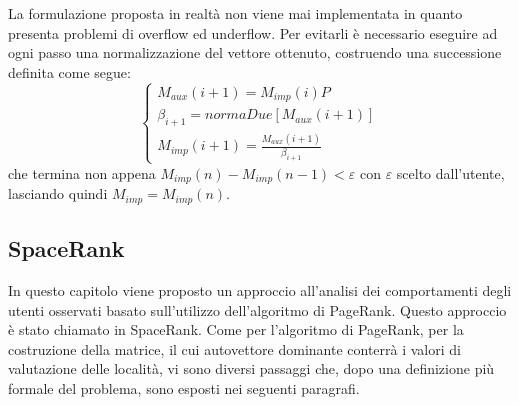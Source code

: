 La formulazione proposta in realt\`a non viene mai implementata in quanto
presenta problemi di overflow ed underflow. Per evitarli \`e necessario
eseguire ad ogni passo una normalizzazione del vettore ottenuto, costruendo
una successione definita come segue:
\begin{equation}
\left\{\begin{matrix}
M_{aux}(i+1) = M_{imp}(i)P
\\ \beta_{i+1} = normaDue[M_{aux}(i+1)]
\\ M_{imp}(i+1) = \frac{M_{aux}(i+1)}{\beta_{i+1}}
\end{matrix}\right.
\end{equation}
che termina non appena $ M_{imp}(n) - M_{imp}(n- 1) < \varepsilon $ con $ \varepsilon $ scelto dall'utente,
lasciando quindi $ M_{imp} = M_{imp}(n) $.

\subsection{SpaceRank}
In questo capitolo viene proposto un approccio all'analisi dei comportamenti
degli utenti osservati basato sull'utilizzo dell'algoritmo di PageRank. Questo
approccio \`e stato chiamato in \cite{cit_49} SpaceRank. Come per l'algoritmo di PageRank,
per la costruzione della matrice, il cui autovettore dominante conterr\`a
i valori di valutazione delle localit\`a, vi sono diversi passaggi che, dopo una
definizione pi\`u formale del problema, sono esposti nei seguenti paragrafi.

